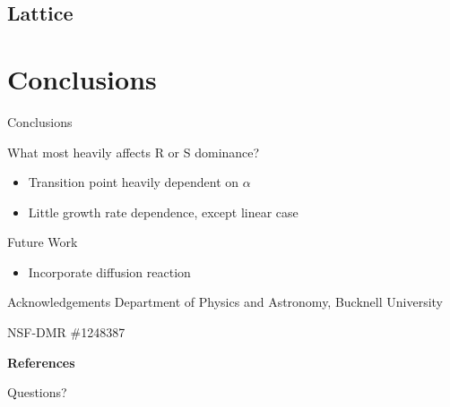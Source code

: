 \documentclass[10pt, notes]{beamer}       %
\begin{document}
\subsection{Lattice}


\section{Conclusions}
\begin{frame}{Conclusions}
  \begin{alertblock}{What most heavily affects R or S dominance?}
    \begin{itemize}
      \item Transition point heavily dependent on $\alpha$
      \item Little growth rate dependence, except linear case
    \end{itemize}
  \end{alertblock}

\end{frame}

\begin{frame}{Future Work}
  \begin{itemize}
    \item Incorporate diffusion reaction
  \end{itemize}

\end{frame}

\begin{frame}{Acknowledgements}
Department of Physics and Astronomy, Bucknell University

NSF-DMR \#1248387

\vfill
\textbf{References}
% 
% 
\end{frame}

\begin{frame}[standout]
  Questions?
\end{frame}


\appendix
\end{document}
